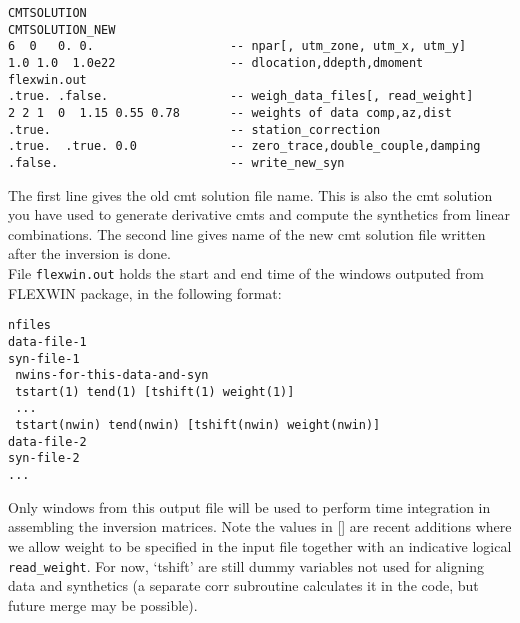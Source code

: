 \documentclass[12pt,titlepage,fleqn]{article}
\begin{document}
\begin{verbatim}
CMTSOLUTION
CMTSOLUTION_NEW
6  0   0. 0.                   -- npar[, utm_zone, utm_x, utm_y]
1.0 1.0  1.0e22                -- dlocation,ddepth,dmoment
flexwin.out
.true. .false.                 -- weigh_data_files[, read_weight]
2 2 1  0  1.15 0.55 0.78       -- weights of data comp,az,dist
.true.                         -- station_correction
.true.  .true. 0.0             -- zero_trace,double_couple,damping
.false.                        -- write_new_syn
\end{verbatim}
The first line gives the old cmt solution file name. This is also the cmt solution you have used to generate derivative cmts and compute the synthetics from linear combinations. The second line gives name of the new cmt solution file written after the inversion is done.\\
File \verb=flexwin.out= holds the start and end time of the windows outputed from FLEXWIN package, in the following format:
\begin{verbatim}
nfiles
data-file-1
syn-file-1
 nwins-for-this-data-and-syn
 tstart(1) tend(1) [tshift(1) weight(1)]
 ...
 tstart(nwin) tend(nwin) [tshift(nwin) weight(nwin)]
data-file-2
syn-file-2
...
\end{verbatim}
Only windows from this output file will be used to perform time integration in assembling the inversion matrices. Note the values in [] are recent additions where we allow weight to be specified in the input file together with an indicative logical \verb+read_weight+. For now, `tshift' are still dummy variables not used for aligning data and synthetics (a separate corr subroutine calculates it in the code, but future merge may be possible).
\end{document}
